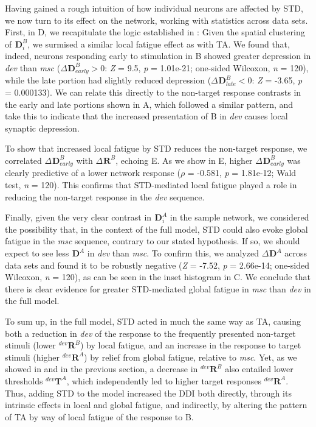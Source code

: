 \documentclass[9pt,lineno,onehalfspacing]{elife}
\newcommand{\dev}{\textit{dev}}
\newcommand{\msc}{\textit{msc}}
\newcommand{\R}[3][]{{}^{#1}_{}\boldsymbol R^{#2}_{#3}}
\newcommand{\T}[3][]{{}^{#1}_{}\boldsymbol T^{#2}_{#3}}
\newcommand{\D}[3][]{{}^{#1}_{}\boldsymbol D^{#2}_{#3}}
\begin{document}
Having gained a rough intuition of how individual neurons are affected by STD, we now turn to its effect on the network, working with statistics across data sets. First, in D, we recapitulate the logic established in : Given the spatial clustering of $\D{B}{i}$, we surmised a similar local fatigue effect as with TA. We found that, indeed, neurons responding early to stimulation in B showed greater depression in \dev{} than \msc{} ($\Delta \D{B}{early} > 0$: \textit{Z} = 9.5, \textit{p} = 1.01e-21; one-sided Wilcoxon, \textit{n} = 120), while the late portion had slightly reduced depression ($\Delta \D{B}{late} < 0$: \textit{Z} = -3.65, \textit{p} = 0.000133). We can relate this directly to the non-target response contrasts in the early and late portions shown in A, which followed a similar pattern, and take this to indicate that the increased presentation of B in \dev{} causes local synaptic depression. %

To show that increased local fatigue by STD reduces the non-target response, we correlated $\Delta \D{B}{early}$ with $\Delta \R{B}{}$, echoing E. As we show in E, higher $\Delta \D{B}{early}$ was clearly predictive of a lower network response ($\rho$ = -0.581, \textit{p} = 1.81e-12; Wald test, \textit{n} = 120). This confirms that STD-mediated local fatigue played a role in reducing the non-target response in the \dev{} sequence.

Finally, given the very clear contrast in $\D{A}{i}$ in the sample network, we considered the possibility that, in the context of the full model, STD could also evoke global fatigue in the \msc{} sequence, contrary to our stated hypothesis. If so, we should expect to see less $\D{A}{}$ in \dev{} than \msc{}. To confirm this, we analyzed $\Delta \D{A}{}$ across data sets and found it to be robustly negative (\textit{Z} = -7.52, \textit{p} = 2.66e-14; one-sided Wilcoxon, \textit{n} = 120), as can be seen in the inset histogram in C. We conclude that there is clear evidence for greater STD-mediated global fatigue in \msc{} than \dev{} in the full model.

To sum up, in the full model, STD acted in much the same way as TA, causing both a reduction in \dev{} of the response to the frequently presented non-target stimuli (lower $\R[dev]{B}{}$) by local fatigue, and an increase in the response to target stimuli (higher $\R[dev]{A}{}$) by relief from global fatigue, relative to \msc{}. Yet, as we showed in  and in the previous section, a decrease in $\R[dev]{B}{}$ also entailed lower thresholds $\T[dev]{A}{}$, which independently led to higher target responses $\R[dev]{A}{}$. Thus, adding STD to the model increased the DDI both directly, through its intrinsic effects in local and global fatigue, and indirectly, by altering the pattern of TA by way of local fatigue of the response to B.
\end{document}
